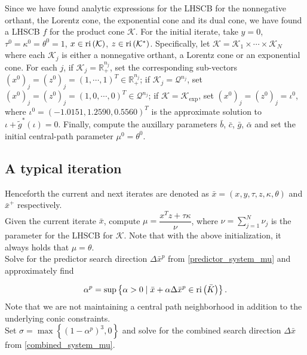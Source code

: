 \documentclass[10pt]{article}
\theoremstyle{definition}
\theoremstyle{plain}
\def\relint{\protect{\textnormal{ri}}}
\begin{document}
Since we have found analytic expressions for the LHSCB for the nonnegative orthant, the Lorentz cone, the exponential cone and its dual cone, we have found a LHSCB $f$ for the product cone $\mathcal{K}$. For the initial iterate, take $y = 0$, $\tau^0 = \kappa^0 = \theta^0 = 1$, $x \in \relint \left(\mathcal{K}\right)$, $z\in\relint\left(\mathcal{K}^*\right)$. Specifically, let $\mathcal{K} = \mathcal{K}_1 \times \cdots \times \mathcal{K}_N$ where each $\mathcal{K}_j$ is either a nonnegative orthant, a Lorentz cone or an exponential cone. For each $j$, if $\mathcal{K}_j = \mathbb{R}_+^{n_j}$, set the corresponding sub-vectors $\left(x^0\right)_j = \left(z^0\right)_j = (1,\cdots, 1)^T \in \mathbb{R}_+^{n_j}$; if $\mathcal{K}_j = \mathcal{Q}^{n_j}$, set $\left(x^0\right)_j = \left(z^0\right)_j = (1,0,\cdots, 0)^T \in \mathcal{Q}^{n_j}$; if $\mathcal{K} = \mathcal{K}_{\exp}$, set $\left(x^0\right)_j = \left(z^0\right)_j = \iota^0$, where $\iota^0 =   (-1.0151, 1.2590, 0.5560)^T$ is the approximate solution to 
$\iota + \tilde g^*(\iota) = 0$. Finally, compute the auxillary parameters $\bar{b}$, $\bar{c}$, $\bar{g}$, $\bar{\alpha}$ and set the initial central-path parameter $\mu^0 = \theta^0$.

\subsection{A typical iteration}\label{A_typical_iteration}
Henceforth the current and next iterates are denoted as  $ \bar x = (x,y, \tau, z,\kappa, \theta)$ and  $ \bar x^+$ respectively. \\

Given the current iterate $\bar x$, compute $\mu = \dfrac{x^T z + \tau \kappa}{\nu}$, where $\nu = \sum_{j=1}^N \nu_j$ is the parameter for the LHSCB for $\mathcal{K}$. Note that with the above initialization, it always holds that $\mu = \theta$. \\

Solve for the predictor search direction $\Delta \bar x^p$ from \eqref{predictor_system_mu} and approximately find

\[\alpha^p = \sup \left\{ \alpha > 0 \mid \bar x + \alpha \Delta \bar x^p \in \relint \left(\bar K\right)
 \right\}. \]
Note that we are not maintaining a central path neighborhood in addition to the underlying conic constraints. \\

Set $\sigma = \max\left\{(1-\alpha^p)^3, 0\right\}$ and solve for the combined search direction $\Delta \bar x$ from \eqref{combined_system_mu}. \\
\end{document}
